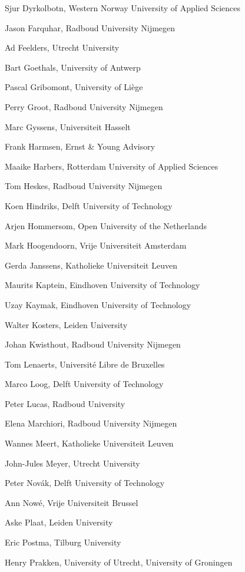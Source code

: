 \documentclass[a4paper,oneside]{book}
\begin{document}
\begin{compactitem}[]
		\item[] Sjur Dyrkolbotn, Western Norway University of Applied Sciences
		\item[] Jason Farquhar, Radboud University Nijmegen
		\item[] Ad Feelders, Utrecht University
		\item[] Bart Goethals, University of Antwerp
		\item[] Pascal Gribomont, University of Liège
		\item[] Perry Groot, Radboud University Nijmegen
		\item[] Marc Gyssens, Universiteit Hasselt
		\item[] Frank Harmsen, Ernst \& Young Advisory
		\item[] Maaike Harbers, Rotterdam University of Applied Sciences
		\item[] Tom Heskes, Radboud University Nijmegen
		\item[] Koen Hindriks, Delft University of Technology
		\item[] Arjen Hommersom, Open University of the Netherlands
		\item[] Mark Hoogendoorn, Vrije Universiteit Amsterdam
		\item[] Gerda Janssens, Katholieke Universiteit Leuven
		\item[] Maurits Kaptein, Eindhoven University of Technology
		\item[] Uzay Kaymak, Eindhoven University of Technology
		\item[] Walter Kosters, Leiden University
		\item[] Johan Kwisthout, Radboud University Nijmegen
		\item[] Tom Lenaerts, Université Libre de Bruxelles
		\item[] Marco Loog, Delft University of Technology
		\item[] Peter Lucas, Radboud University
		\item[] Elena Marchiori, Radboud University Nijmegen
		\item[] Wannes Meert, Katholieke Universiteit Leuven
		\item[] John-Jules Meyer, Utrecht University
		\item[] Peter Nov\'ak, Delft University of Technology
		\item[] Ann Now\'e, Vrije Universiteit Brussel
		\item[] Aske Plaat, Leiden University
		\item[] Eric Postma, Tilburg University
		\item[] Henry Prakken, University of Utrecht, University of Groningen

\end{compactitem}
\end{document}
